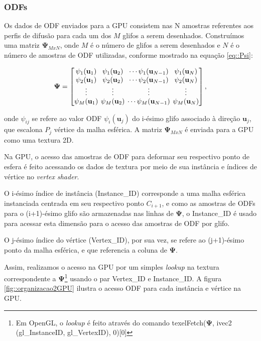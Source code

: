 \documentclass[
    12pt,                %
    oneside,            %
    a4paper,            %
    english,            %
    french,                %
    spanish,            %
    brazil                %
    ]{abntex2}
\begin{document}
\subsubsection {ODFs}

Os dados de ODF enviados para a GPU consistem nas N amostras referentes aos perfis de difusão para cada um dos $M$ glifos a serem desenhados. Construímos uma matriz $\mathbf {\Psi}_{MxN} $, onde $M$ é o número de glifos a serem desenhados e $N$ é o número de amostras de ODF utilizadas, conforme mostrado na equação \ref {eq::Psi}:

\begin{equation}
\label{eq::Psi}
\mathbf{\Psi} = 
\begingroup %
\setlength\arraycolsep{2pt}
\begin{bmatrix} 
    \psi_1(\mathbf{u}_1) & \psi_1(\mathbf{u}_2) & \cdots \psi_1(\mathbf{u}_{N-1}) & \psi_1(\mathbf{u}_{N})  \\   
     \psi_2(\mathbf{u}_1)& \psi_2(\mathbf{u}_2) & \cdots \psi_2(\mathbf{u}_{N-1}) & \psi_2(\mathbf{u}_{N}) \\
    \vdots & \vdots & \vdots & \vdots  \\   
     \psi_M(\mathbf{u}_1)&\psi_M(\mathbf{u}_2) & \cdots \psi_M(\mathbf{u}_{N-1}) & \psi_M(\mathbf{u}_{N})
\end{bmatrix}, 
\endgroup
\end{equation}

onde $\psi_ {ij} $ se refere ao valor ODF $\psi_i (\mathbf {u} _j) $ do i-ésimo glifo associado à direção $\mathbf {u} _j $, que escalona $ P_j $ vértice da malha esférica. A matriz $\mathbf {\Psi}_{MxN}$ é enviada para a GPU como uma textura 2D.

Na GPU, o acesso das amostras de ODF para deformar seu respectivo ponto de esfera é feito acessando os dados de textura por meio de sua instância e índices de vértice no \textit{vertex shader}.

O i-ésimo índice de instância (Instance\_ID) corresponde a uma malha esférica instanciada centrada em seu respectivo ponto $C_{i+1}$, e como as amostras de ODFs para o (i+1)-ésimo glifo são armazenadas nas linhas de $\mathbf{\Psi}$, o Instance\_ID é usado para acessar esta dimensão para o acesso das amostras de ODF por glifo.

O j-ésimo índice do vértice (Vertex\_ID), por sua vez, se refere ao (j+1)-ésimo ponto da malha esférica, e que referencia a coluna de $\mathbf{\Psi}$.

Assim, realizamos o acesso na GPU por um simples \textit{lookup} na textura correspondente a $\mathbf{\Psi}$\footnote{Em OpenGL, o \textit{lookup} é feito através do comando texelFetch($\mathbf {\Psi}$, ivec2 (gl\_InstanceID, gl\_VertexID), 0)[0]} usando o par Vertex\_ID e Instance\_ID. A figura \ref{fig::organizacao2GPU} ilustra o acesso ODF para cada instância e vértice na GPU.
\end{document}
